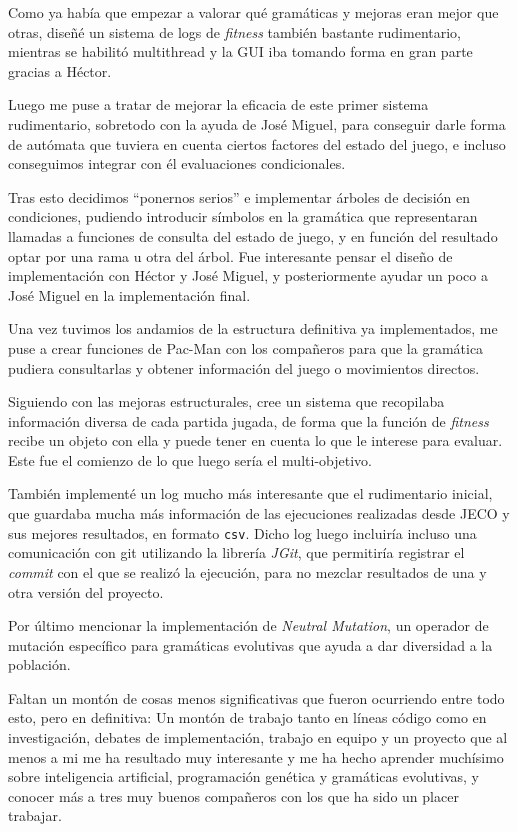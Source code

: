 Como ya había que empezar a valorar qué gramáticas y mejoras eran mejor que otras, diseñé un sistema de logs de \textit{fitness} también bastante rudimentario, mientras se habilitó multithread y la GUI iba tomando forma en gran parte gracias a Héctor.

Luego me puse a tratar de mejorar la eficacia de este primer sistema rudimentario, sobretodo con la ayuda de José Miguel, para conseguir darle forma de autómata que tuviera en cuenta ciertos factores del estado del juego, e incluso conseguimos integrar con él evaluaciones condicionales.

Tras esto decidimos ``ponernos serios'' e implementar árboles de decisión en condiciones, pudiendo introducir símbolos en la gramática que representaran llamadas a funciones de consulta del estado de juego, y en función del resultado optar por una rama u otra del árbol. Fue interesante pensar el diseño de implementación con Héctor y José Miguel, y posteriormente ayudar un poco a José Miguel en la implementación final.

Una vez tuvimos los andamios de la estructura definitiva ya implementados, me puse a crear funciones de Pac-Man con los compañeros para que la gramática pudiera consultarlas y obtener información del juego o movimientos directos.

Siguiendo con las mejoras estructurales, cree un sistema que recopilaba información diversa de cada partida jugada, de forma que la función de \textit{fitness} recibe un objeto con ella y puede tener en cuenta lo que le interese para evaluar. Este fue el comienzo de lo que luego sería el multi-objetivo.

También implementé un log mucho más interesante que el rudimentario inicial, que guardaba mucha más información de las ejecuciones realizadas desde JECO y sus mejores resultados, en formato \texttt{csv}. Dicho log luego incluiría incluso una comunicación con git utilizando la librería \textit{JGit}, que permitiría registrar el \textit{commit} con el que se realizó la ejecución, para no mezclar resultados de una y otra versión del proyecto.

Por último mencionar la implementación de \textit{Neutral Mutation}, un operador de mutación específico para gramáticas evolutivas que ayuda a dar diversidad a la población. 

Faltan un montón de cosas menos significativas que fueron ocurriendo entre todo esto, pero en definitiva: Un montón de trabajo tanto en líneas código como en investigación, debates de implementación, trabajo en equipo y un proyecto que al menos a mi me ha resultado muy interesante y me ha hecho aprender muchísimo sobre inteligencia artificial, programación genética y gramáticas evolutivas, y conocer más a tres muy buenos compañeros con los que ha sido un placer trabajar.
